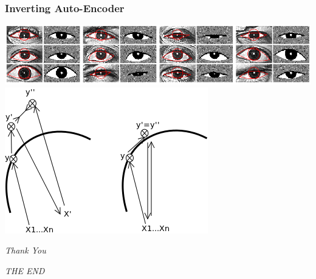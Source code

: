 \documentclass{beamer}
\begin{document}
\begin{frame}
\frametitle{Inverting Auto-Encoder}
\begin{center}
\includegraphics[scale = 0.3]{eyes.png}\\
\includegraphics[scale = 0.3]{breeder.png}
\end{center} 
\end{frame} 

\begin{frame}
\centerline{
\huge
\emph{Thank You}} 
\vspace{10 mm} 
\centerline{
\huge
\emph{THE END}} 

\end{frame}
\end{document}

